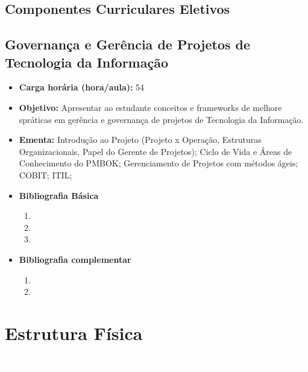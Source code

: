 \documentclass[11pt,fleqn]{book} %
\begin{document}
\section{Componentes Curriculares Eletivos}


\newpage
\section{Governança e Gerência de Projetos de Tecnologia da Informação}\label{6_opt01}
\begin{itemize}
	\item \textbf{Carga horária (hora/aula):} 54
	\item \textbf{Objetivo:} Apresentar ao estudante conceitos e frameworks de melhore spráticas em gerência e governança de projetos de Tecnologia da Informação.
	\item \textbf{Ementa:} 
	Introdução ao Projeto (Projeto x Operação, Estruturas Organizacionais, Papel do Gerente de Projetos);
	Ciclo de Vida e Áreas de Conhecimento do PMBOK;
	Gerenciamento de Projetos com métodos ágeis;
	COBIT;
	ITIL;
	\item \textbf{Bibliografia Básica}
	\begin{enumerate}
		\item 
		\item 
		\item 
	\end{enumerate}
	\item \textbf{Bibliografia complementar}
	\begin{enumerate}
		\item 
		\item
	\end{enumerate} 	
\end{itemize}


\chapter{Estrutura Física}\label{estrutura}
\vspace{6em}
\begin{flushright}
	\textit{\textcolor{white}{Um bonita citação...}}
\end{flushright}
\vspace{12em}
\end{document}
